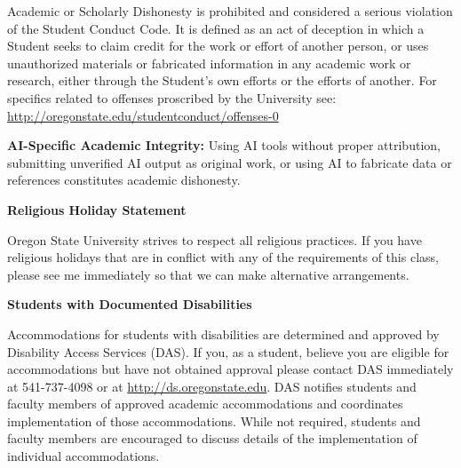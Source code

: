 \documentclass[11pt]{article}
\begin{document}
Academic or Scholarly Dishonesty is prohibited and considered a serious violation of the Student Conduct Code. It is defined as an act of deception in which a Student seeks to claim credit for the work or effort of another person, or uses unauthorized materials or fabricated information in any academic work or research, either through the Student's own efforts or the efforts of another. For specifics related to offenses proscribed by the University see: \url{http://oregonstate.edu/studentconduct/offenses-0}

\textcolor{aiblue}{\textbf{AI-Specific Academic Integrity:} Using AI tools without proper attribution, submitting unverified AI output as original work, or using AI to fabricate data or references constitutes academic dishonesty.}

\vspace{8pt}

\noindent\textbf{Religious Holiday Statement}

Oregon State University strives to respect all religious practices. If you have religious holidays that are in conflict with any of the requirements of this class, please see me immediately so that we can make alternative arrangements.

\vspace{8pt}

\noindent\textbf{Students with Documented Disabilities}

Accommodations for students with disabilities are determined and approved by Disability Access Services (DAS). If you, as a student, believe you are eligible for accommodations but have not obtained approval please contact DAS immediately at 541-737-4098 or at \url{http://ds.oregonstate.edu}. DAS notifies students and faculty members of approved academic accommodations and coordinates implementation of those accommodations. While not required, students and faculty members are encouraged to discuss details of the implementation of individual accommodations.
\end{document}
